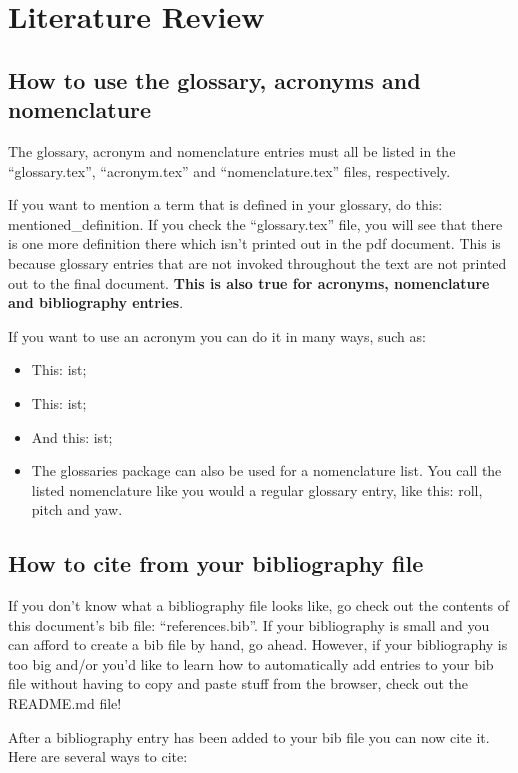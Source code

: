 \chapter{Literature Review}
\label{chapter:literature_review}

\section{How to use the glossary, acronyms and nomenclature}

The glossary, acronym and nomenclature entries must all be listed in the ``glossary.tex'', ``acronym.tex'' and ``nomenclature.tex'' files, respectively. 

If you want to mention a term that is defined in your glossary, do this: \gls{mentioned_definition}. If you check the ``glossary.tex'' file, you will see that there is one more definition there which isn't printed out in the pdf document. This is because glossary entries that are not invoked throughout the text are not printed out to the final document. \textbf{This is also true for acronyms, nomenclature and bibliography entries}.

If you want to use an acronym you can do it in many ways, such as:
\begin{itemize}
	\item This: \acrshort{ist};
	\item This: \acrlong{ist};
	\item And this: \acrfull{ist};
	\item The glossaries package can also be used for a nomenclature list. You call the listed nomenclature like you would a regular glossary entry, like this: \gls{roll}, \gls{pitch} and \gls{yaw}.
\end{itemize} 


\section{How to cite from your bibliography file}

If you don't know what a bibliography file looks like, go check out the contents of this document's bib file: ``references.bib''. If your bibliography is small and you can afford to create a bib file by hand, go ahead. However, if your bibliography is too big and/or you'd like to learn how to automatically add entries to your bib file without having to copy and paste stuff from the browser, check out the README.md file!

After a bibliography entry has been added to your bib file you can now cite it. Here are several ways to cite:

